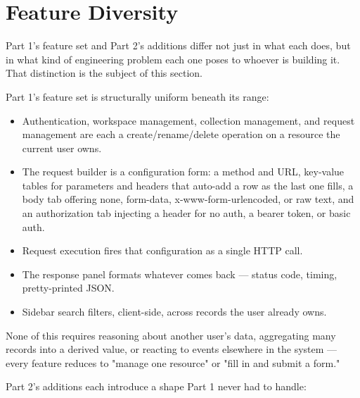 \section{Feature Diversity}

Part 1's feature set and Part 2's additions differ not just in what each does, but in what kind of engineering problem each one poses to whoever is building it. That distinction is the subject of this section.

Part 1's feature set is structurally uniform beneath its range:

\begin{itemize}[itemsep=6pt, parsep=0pt, topsep=6pt]
    \item Authentication, workspace management, collection management, and request management are each a create/rename/delete operation on a resource the current user owns.
    \item The request builder is a configuration form: a method and URL, key-value tables for parameters and headers that auto-add a row as the last one fills, a body tab offering none, form-data, x-www-form-urlencoded, or raw text, and an authorization tab injecting a header for no auth, a bearer token, or basic auth.
    \item Request execution fires that configuration as a single HTTP call.
    \item The response panel formats whatever comes back --- status code, timing, pretty-printed JSON.
    \item Sidebar search filters, client-side, across records the user already owns.
\end{itemize}

None of this requires reasoning about another user's data, aggregating many records into a derived value, or reacting to events elsewhere in the system --- every feature reduces to "manage one resource" or "fill in and submit a form."

Part 2's additions each introduce a shape Part 1 never had to handle:

